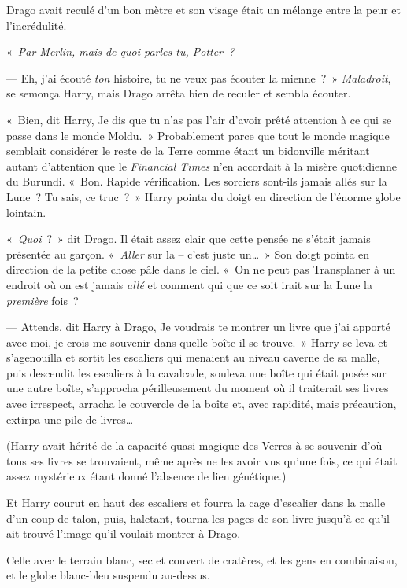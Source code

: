 Drago avait reculé d'un bon mètre et son visage était un mélange entre la peur et l'incrédulité.

«~\emph{Par Merlin, mais de quoi parles-tu, Potter~?}

--- Eh, j'ai écouté \emph{ton} histoire, tu ne veux pas écouter la mienne~?~» \emph{Maladroit}, se semonça Harry, mais Drago arrêta bien de reculer et sembla écouter.

«~Bien, dit Harry, Je dis que tu n'as pas l'air d'avoir prêté attention à ce qui se passe dans le monde Moldu.~» Probablement parce que tout le monde magique semblait considérer le reste de la Terre comme étant un bidonville méritant autant d'attention que le \emph{Financial Times} n'en accordait à la misère quotidienne du Burundi. «~Bon. Rapide vérification. Les sorciers sont-ils jamais allés sur la Lune~? Tu sais, ce truc~?~» Harry pointa du doigt en direction de l'énorme globe lointain.

«~\emph{Quoi}~?~» dit Drago. Il était assez clair que cette pensée ne s'était jamais présentée au garçon. «~\emph{Aller} sur la -- c'est juste un…~» Son doigt pointa en direction de la petite chose pâle dans le ciel. «~On ne peut pas Transplaner à un endroit où on est jamais \emph{allé} et comment qui que ce soit irait sur la Lune la \emph{première} fois~?

--- Attends, dit Harry à Drago, Je voudrais te montrer un livre que j'ai apporté avec moi, je crois me souvenir dans quelle boîte il se trouve.~» Harry se leva et s'agenouilla et sortit les escaliers qui menaient au niveau caverne de sa malle, puis descendit les escaliers à la cavalcade, souleva une boîte qui était posée sur une autre boîte, s'approcha périlleusement du moment où il traiterait ses livres avec irrespect, arracha le couvercle de la boîte et, avec rapidité, mais précaution, extirpa une pile de livres…

(Harry avait hérité de la capacité quasi magique des Verres à se souvenir d'où tous ses livres se trouvaient, même après ne les avoir vus qu'une fois, ce qui était assez mystérieux étant donné l'absence de lien génétique.)

Et Harry courut en haut des escaliers et fourra la cage d'escalier dans la malle d'un coup de talon, puis, haletant, tourna les pages de son livre jusqu'à ce qu'il ait trouvé l'image qu'il voulait montrer à Drago.

Celle avec le terrain blanc, sec et couvert de cratères, et les gens en combinaison, et le globe blanc-bleu suspendu au-dessus.

